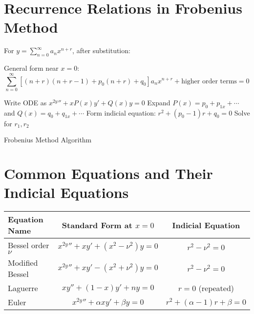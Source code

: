 \documentclass[12pt]{article}
\begin{document}
\section{Recurrence Relations in Frobenius Method}

For $y = \sum_{n=0}^{\infty} a_{n} x^{n+r}$, after substitution:

General form near $x = 0$:
$$\sum_{n=0}^{\infty} \left[(n+r)(n+r-1) + p_{0}(n+r) + q_{0}\right]a_{n} x^{n+r} + \text{higher order terms} = 0$$

\begin{algorithm}[H]
\SetAlgoLined
{}
Write ODE as $x^{2y}'' + xP(x)y' + Q(x)y = 0$\;
Expand $P(x) = p_{0} + p_{1x} + \cdots$ and $Q(x) = q_{0} + q_{1x} + \cdots$\;
Form indicial equation: $r^{2} + (p_{0}-1)r + q_{0} = 0$\;
Solve for $r_{1}, r_{2}$\;
\caption{Frobenius Method Algorithm}
\end{algorithm}

\section{Common Equations and Their Indicial Equations}

\begin{center}
\begin{tabular}{|l|c|c|}
\hline
\textbf{Equation Name} & \textbf{Standard Form at $x=0$} & \textbf{Indicial Equation} \\
\hline
Bessel order $\nu$ & $x^{2y}'' + xy' + (x^{2}-\nu^{2})y = 0$ & $r^{2} - \nu^{2} = 0$ \\
\hline
Modified Bessel & $x^{2y}'' + xy' - (x^{2}+\nu^{2})y = 0$ & $r^{2} - \nu^{2} = 0$ \\
\hline
Laguerre & $xy'' + (1-x)y' + ny = 0$ & $r = 0$ (repeated) \\
\hline
Euler & $x^{2y}'' + \alpha xy' + \beta y = 0$ & $r^{2} + (\alpha-1)r + \beta = 0$ \\
\hline
\end{tabular}
\end{center}
\end{document}
